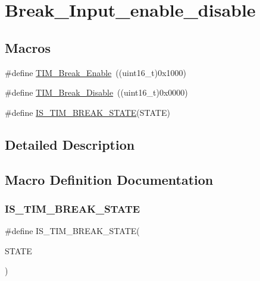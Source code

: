 \hypertarget{group___break___input__enable__disable}{}\section{Break\+\_\+\+Input\+\_\+enable\+\_\+disable}
\label{group___break___input__enable__disable}
\subsection*{Macros}
\begin{DoxyCompactItemize}
\item 
\#define \mbox{\hyperlink{group___break___input__enable__disable_gae7fbc11ac043454b2a880bffe98fdb8c}{T\+I\+M\+\_\+\+Break\+\_\+\+Enable}}~((uint16\+\_\+t)0x1000)
\item 
\#define \mbox{\hyperlink{group___break___input__enable__disable_ga31ba16dd70ad4d99adc911f7bf6662e5}{T\+I\+M\+\_\+\+Break\+\_\+\+Disable}}~((uint16\+\_\+t)0x0000)
\item 
\#define \mbox{\hyperlink{group___break___input__enable__disable_ga29dd5484bdc69a467387bd8059b69f0e}{I\+S\+\_\+\+T\+I\+M\+\_\+\+B\+R\+E\+A\+K\+\_\+\+S\+T\+A\+TE}}(S\+T\+A\+TE)
\end{DoxyCompactItemize}


\subsection{Detailed Description}


\subsection{Macro Definition Documentation}
\mbox{\label{group___break___input__enable__disable_ga29dd5484bdc69a467387bd8059b69f0e}} 
\subsubsection{\texorpdfstring{IS\_TIM\_BREAK\_STATE}{IS\_TIM\_BREAK\_STATE}}
{\footnotesize\ttfamily \#define I\+S\+\_\+\+T\+I\+M\+\_\+\+B\+R\+E\+A\+K\+\_\+\+S\+T\+A\+TE(\begin{DoxyParamCaption}\item[{}]{S\+T\+A\+TE }\end{DoxyParamCaption})}

